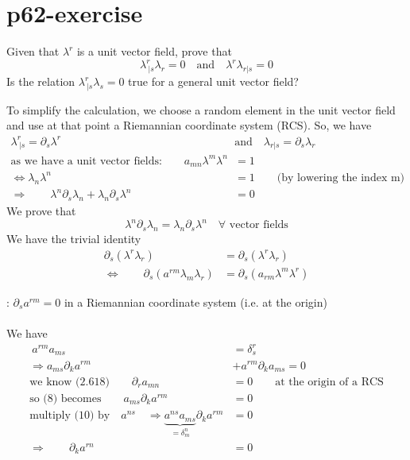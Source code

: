 \section{p62-exercise}
\begin{tcolorbox}
Given that $\lambda^r$ is a unit vector field, prove that $$\lambda^r_{\ |s}\lambda_r = 0 \quad \text{and}\quad \lambda^r\lambda_{r|s} = 0 $$
Is the relation $\lambda^r_{\ |s}\lambda_s = 0$ true for a general unit vector field?
\end{tcolorbox}
To simplify the calculation, we choose a random element in the unit vector field and use at that point a Riemannian coordinate system (RCS). So, we have
\begin{align}
\lambda^r_{\ |s} = \partial_s \lambda^r \quad & \text{and}\quad \lambda_{r|s} = \partial_s \lambda_r\\
\text{as we have a unit vector fields:}\quad\quad a_{mn}\lambda^m\lambda^n &= 1\\
\Leftrightarrow \lambda_n\lambda^n &= 1\quad\quad\text{(by lowering the index m)}\\
\Rightarrow \quad\quad \lambda^n\partial_s \lambda_n + \lambda_n\partial_s \lambda^n &= 0
\end{align}
We prove that $$\lambda^n\partial_s\lambda_n = \lambda_n\partial_s\lambda^n\quad \forall\text{ vector fields}$$
We have the trivial identity
\begin{align}
\partial_s(\lambda^r\lambda_r) &= \partial_s(\lambda^r\lambda_r)\\
\Leftrightarrow \quad\quad \partial_s(a^{rm}\lambda_m\lambda_r) &= \partial_s(a_{rm}\lambda^m\lambda^r)
\end{align}
\begin{lemma}: $\partial_sa^{rm} = 0$ in a Riemannian coordinate system (i.e. at the origin)\\\\
We have
\begin{align}
\ a^{rm}a_{ms} &= \delta^r_s\\
\Rightarrow a_{ms}\partial_k a^{rm}  & +a^{rm}\partial_k a_{ms} = 0\\
\text{we know (2.618)}\quad\quad \partial_r a_{mn} &= 0\quad\quad\text{at the origin of a RCS}\\
\text{so (8) becomes}\quad\quad a_{ms}\partial_k a^{rm} & = 0\\
\text{multiply (10) by}\quad a^{ns}\quad\Rightarrow \underbrace{a^{ns}a_{ms}}_{= \delta^n_m}\partial_k a^{rm}& = 0\\
\Rightarrow\quad\quad \partial_k a^{rn}& = 0
\end{align}
\end{lemma}
